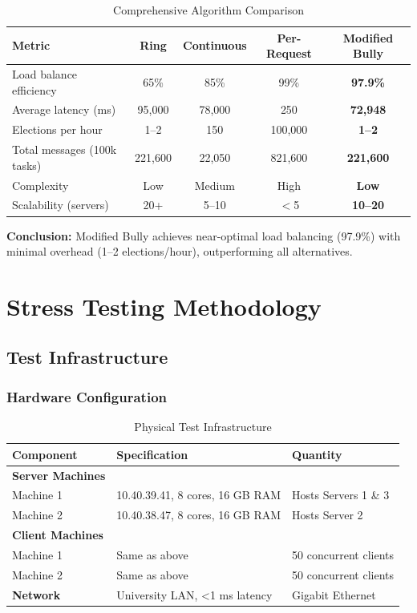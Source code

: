 \documentclass[12pt,a4paper]{article}
\begin{document}
\begin{table}[h]
\centering
\caption{Comprehensive Algorithm Comparison}
\label{tab:algorithm-summary}
\small
\begin{tabular}{@{}lcccc@{}}
\toprule
\textbf{Metric} & \textbf{Ring} & \textbf{Continuous} & \textbf{Per-Request} & \textbf{Modified Bully} \\
\midrule
Load balance efficiency & 65\% & 85\% & 99\% & \textbf{97.9\%} \\
Average latency (ms) & 95,000 & 78,000 & 250 & \textbf{72,948} \\
Elections per hour & 1--2 & 150 & 100,000 & \textbf{1--2} \\
Total messages (100k tasks) & 221,600 & 22,050 & 821,600 & \textbf{221,600} \\
Complexity & Low & Medium & High & \textbf{Low} \\
Scalability (servers) & 20+ & 5--10 & $<$5 & \textbf{10--20} \\
\bottomrule
\end{tabular}
\end{table}

\textbf{Conclusion:} Modified Bully achieves near-optimal load balancing (97.9\%) with minimal overhead (1--2 elections/hour), outperforming all alternatives.

\newpage

\section{Stress Testing Methodology}
\label{sec:stress}

\subsection{Test Infrastructure}

\subsubsection{Hardware Configuration}

\begin{table}[h]
\centering
\caption{Physical Test Infrastructure}
\label{tab:hardware}
\begin{tabular}{@{}lll@{}}
\toprule
\textbf{Component} & \textbf{Specification} & \textbf{Quantity} \\
\midrule
\textbf{Server Machines} & & \\
\quad Machine 1 & 10.40.39.41, 8 cores, 16 GB RAM & Hosts Servers 1 \& 3 \\
\quad Machine 2 & 10.40.38.47, 8 cores, 16 GB RAM & Hosts Server 2 \\
\textbf{Client Machines} & & \\
\quad Machine 1 & Same as above & 50 concurrent clients \\
\quad Machine 2 & Same as above & 50 concurrent clients \\
\textbf{Network} & University LAN, <1 ms latency & Gigabit Ethernet \\
\bottomrule
\end{tabular}
\end{table}
\end{document}
